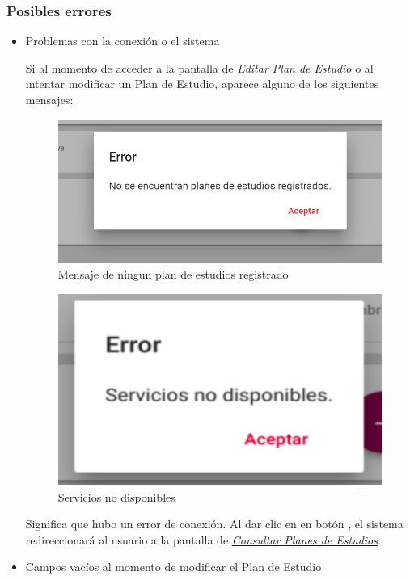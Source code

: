 \subsubsection{Posibles errores}

\begin{itemize}
	\item Problemas con la conexión o el sistema

	Si al momento de acceder a la pantalla de \hyperlink{editarPE}{\textit{Editar Plan de Estudio}} o al intentar modificar un Plan de Estudio, aparece alguno de los siguientes mensajes:

	\begin{figure}[!hbtp]
		\centering
		\hypertarget{ms3}{\includegraphics[width=0.7\linewidth]{images/SP4-GPE/m3}}
		\caption{Mensaje de ningun plan de estudios registrado}
		\label{ms3}
	\end{figure}
	\begin{figure}[!hbtp]
		\centering
		\hypertarget{error}{\includegraphics[width=0.7\linewidth]{images/SP4-GPE/error}}
		\caption{Servicios no disponibles}
		\label{error}
	\end{figure}


	Significa que hubo un error de conexión. Al dar clic en en botón  , el sistema redireccionará al usuario a la pantalla de \hyperlink{consultarPE}{\textit{Consultar Planes de Estudios}}.
	\newpage

	\item Campos vacíos al momento de modificar el Plan de Estudio


\end{itemize}
